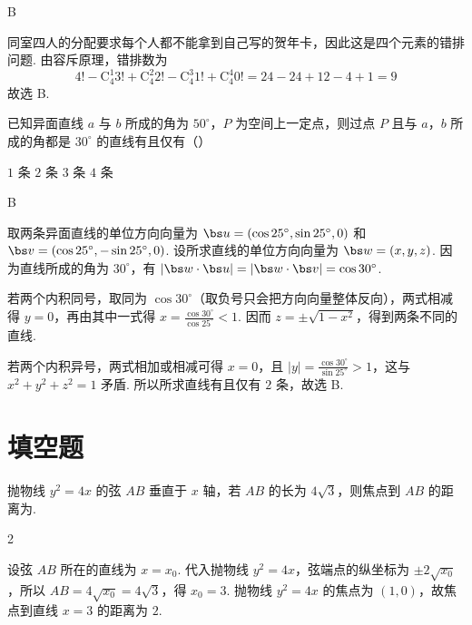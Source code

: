 \documentclass[UTF8,a4paper,oneside,11pt]{ctexbook}
\begin{document}
\begin{answer}
B
\end{answer}

\begin{solution}
同室四人的分配要求每个人都不能拿到自己写的贺年卡，因此这是四个元素的错排问题. 由容斥原理，错排数为
\[
4!-\mathrm C_4^1 3!+\mathrm C_4^2 2!-\mathrm C_4^3 1!+\mathrm C_4^4 0!=24-24+12-4+1=9
\]
故选 B.
\end{solution}

\begin{problem}
已知异面直线 \(a\) 与 \(b\) 所成的角为 \(50^{\circ}\)，\(P\) 为空间上一定点，则过点 \(P\) 且与 \(a\)，\(b\) 所成的角都是 \(30^{\circ}\) 的直线有且仅有（\quad）

\choices
    {\(1\) 条}
    {\(2\) 条}
    {\(3\) 条}
    {\(4\) 条}
\end{problem}

\begin{answer}
B
\end{answer}

\begin{solution}
取两条异面直线的单位方向向量为
\(\bs u=(\cos25^\circ,\sin25^\circ,0)\) 和
\(\bs v=(\cos25^\circ,-\sin25^\circ,0)\). 设所求直线的单位方向向量为
\(\bs w=(x,y,z)\). 因为直线所成的角为 \(30^\circ\)，有
\(\lvert\bs w\cdot\bs u\rvert=\lvert\bs w\cdot\bs v\rvert=\cos30^\circ\).

若两个内积同号，取同为 \(\cos30^\circ\)（取负号只会把方向向量整体反向），两式相减得 \(y=0\)，再由其中一式得
\(x=\frac{\cos30^\circ}{\cos25^\circ}<1\). 因而
\(z=\pm\sqrt{1-x^2}\)，得到两条不同的直线.

若两个内积异号，两式相加或相减可得
\(x=0\)，且 \(\lvert y\rvert=\frac{\cos30^\circ}{\sin25^\circ}>1\)，这与
\(x^2+y^2+z^2=1\) 矛盾. 所以所求直线有且仅有 \(2\) 条，故选 B.
\end{solution}

\section{填空题}

\begin{problem}
抛物线 \(y^{2} = 4x\) 的弦 \(AB\) 垂直于 \(x\) 轴，若 \(AB\) 的长为 \(4\sqrt{3}\)，则焦点到 \(AB\) 的距离为\fillinblank{}.
\end{problem}

\begin{answer}
2
\end{answer}

\begin{solution}
设弦 \(AB\) 所在的直线为 \(x=x_0\). 代入抛物线
\(y^2=4x\)，弦端点的纵坐标为 \(\pm2\sqrt{x_0}\)，所以
\(AB=4\sqrt{x_0}=4\sqrt3\)，得 \(x_0=3\). 抛物线
\(y^2=4x\) 的焦点为 \((1,0)\)，故焦点到直线 \(x=3\) 的距离为 \(2\).
\end{solution}
\end{document}
